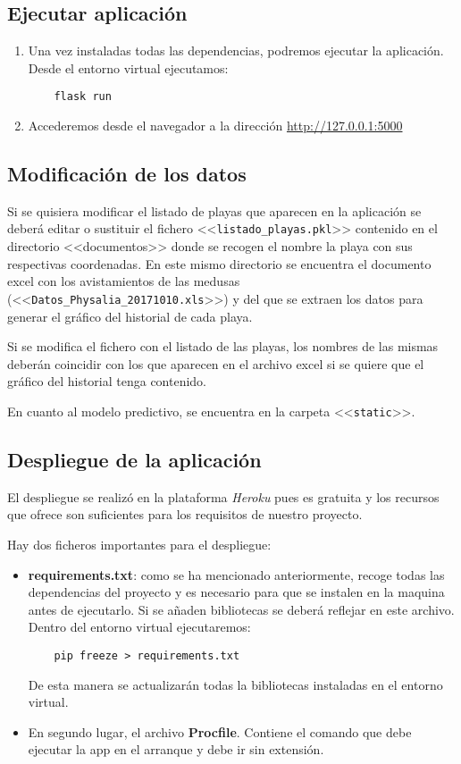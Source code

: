\subsection{Ejecutar aplicación}

\begin{enumerate}
	\item Una vez instaladas todas las dependencias, podremos ejecutar la aplicación. Desde el entorno virtual ejecutamos:
	\begin{verbatim}
	flask run
	\end{verbatim}
	\item Accederemos desde el navegador a la dirección \href{http://127.0.0.1:5000}{http://127.0.0.1:5000}
	
\end{enumerate}

\subsection{Modificación de los datos}

Si se quisiera modificar el listado de playas que aparecen en la aplicación se deberá editar o sustituir el fichero <<\texttt{listado\_playas.pkl}>>  contenido en el directorio <<documentos>> donde se recogen el nombre la playa con sus respectivas coordenadas. En este mismo directorio se encuentra el documento excel con los avistamientos de las medusas (<<\texttt{Datos\_Physalia\_20171010.xls}>>) y del que se extraen los datos para generar el gráfico del historial de cada playa. 

Si se modifica el fichero con el listado de las playas, los nombres de las mismas deberán coincidir con los que aparecen en el archivo excel si se quiere que el gráfico del historial tenga contenido.

En cuanto al modelo predictivo, se encuentra en la carpeta <<\texttt{static}>>.

\subsection{Despliegue de la aplicación}

El despliegue se realizó en la plataforma \emph{Heroku} pues es gratuita y los recursos que ofrece son suficientes para los requisitos de nuestro proyecto.

Hay dos ficheros importantes para el despliegue:
\begin{itemize}
	\item \textbf{requirements.txt}: como se ha mencionado anteriormente, recoge todas las dependencias del proyecto y es necesario para que se instalen en la maquina antes de ejecutarlo. Si se añaden bibliotecas se deberá reflejar en este archivo. Dentro del entorno virtual ejecutaremos:
	\begin{verbatim}
	pip freeze > requirements.txt
	\end{verbatim}
	De esta manera se actualizarán todas la bibliotecas instaladas en el entorno virtual.
	\item En segundo lugar, el archivo \textbf{Procfile}. Contiene el comando que debe ejecutar la app en el arranque y debe ir sin extensión.
\end{itemize}


